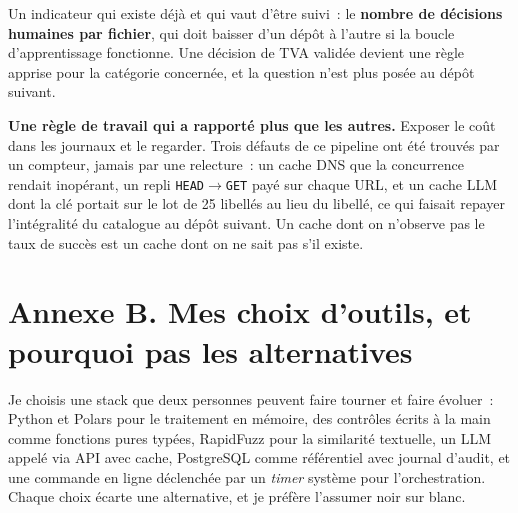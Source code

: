 \documentclass[11pt,a4paper]{article}
\newcommand{\code}[1]{\texttt{\small #1}}
\begin{document}
Un indicateur qui existe déjà et qui vaut d'être suivi~: le \textbf{nombre de décisions humaines par
fichier}, qui doit baisser d'un dépôt à l'autre si la boucle d'apprentissage fonctionne. Une
décision de TVA validée devient une règle apprise pour la catégorie concernée, et la question n'est
plus posée au dépôt suivant.

\begin{notebox}
\textbf{Une règle de travail qui a rapporté plus que les autres.} Exposer le coût dans les journaux
et le regarder. Trois défauts de ce pipeline ont été trouvés par un compteur, jamais par une
relecture~: un cache DNS que la concurrence rendait inopérant, un repli \code{HEAD}$\to$\code{GET}
payé sur chaque URL, et un cache LLM dont la clé portait sur le lot de 25 libellés au lieu du
libellé, ce qui faisait repayer l'intégralité du catalogue au dépôt suivant. Un cache dont on
n'observe pas le taux de succès est un cache dont on ne sait pas s'il existe.
\end{notebox}

\newpage
\section*{Annexe B. Mes choix d'outils, et pourquoi pas les alternatives}

Je choisis une stack que deux personnes peuvent faire tourner et faire évoluer~: Python et Polars
pour le traitement en mémoire, des contrôles écrits à la main comme fonctions pures typées,
RapidFuzz pour la similarité textuelle, un LLM appelé via API avec cache, PostgreSQL comme
référentiel avec journal d'audit, et une commande en ligne déclenchée par un \emph{timer} système
pour l'orchestration. Chaque choix écarte une alternative, et je préfère l'assumer noir sur blanc.
\end{document}
